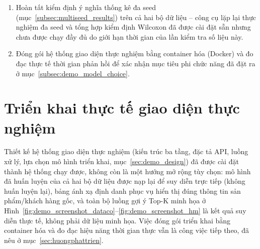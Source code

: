 \begin{enumerate}
    \item Hoàn tất kiểm định ý nghĩa thống kê đa seed (mục~\ref{subsec:multiseed_results}) trên cả hai bộ dữ liệu -- công cụ lặp lại thực nghiệm đa seed và tổng hợp kiểm định Wilcoxon đã được cài đặt sẵn nhưng chưa được chạy đầy đủ do giới hạn thời gian của lần kiểm tra số liệu này.
    \item Đóng gói hệ thống giao diện thực nghiệm bằng container hóa (Docker) và đo đạc thực tế thời gian phản hồi để xác nhận mục tiêu phi chức năng đã đặt ra ở mục~\ref{subsec:demo_model_choice}.
\end{enumerate}

\section{Triển khai thực tế giao diện thực nghiệm}
\label{sec:huongthietke_giaodien}

Thiết kế hệ thống giao diện thực nghiệm (kiến trúc ba tầng, đặc tả API, luồng xử lý, lựa chọn mô hình triển khai, mục~\ref{sec:demo_design}) đã được cài đặt thành hệ thống chạy được, không còn là một hướng mở rộng tùy chọn: mô hình đã huấn luyện của cả hai bộ dữ liệu được nạp lại để suy diễn trực tiếp (không huấn luyện lại), bảng ánh xạ định danh phục vụ hiển thị đúng thông tin sản phẩm/khách hàng gốc, và toàn bộ luồng gợi ý Top-K minh họa ở Hình~\ref{fig:demo_screenshot_dataco}--\ref{fig:demo_screenshot_hm} là kết quả suy diễn thực tế, không phải dữ liệu minh họa. Việc đóng gói triển khai bằng container hóa và đo đạc hiệu năng thời gian thực vẫn là công việc tiếp theo, đã nêu ở mục~\ref{sec:huongphattrien}.